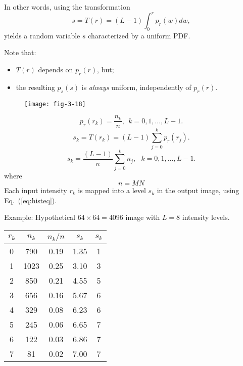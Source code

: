 \begin{frame}
In other words, using the transformation
\[
\boxed{s = T(r) = \left (L - 1\right ) \int_{0}^{r} p_{r}(w) dw},
\]
yields a random variable $s$ characterized by a uniform PDF.

Note that:
\begin{itemize}
\item $T(r)$ depends on $p_{r}(r)$, but;
\item the resulting $p_{s}(s)$ is \textit{always} uniform, independently of $p_{r}(r)$.
\end{itemize}
\begin{figure}
\centering
\texttt{[image: fig-3-18]}
\end{figure}
\end{frame}


\begin{frame}
\[
p_{r}(r_{k}) = \dfrac{n_{k}}{n},\ \ k = 0,1,\ldots,L-1.
\]
\[
s_{k} = T(r_{k}) = (L-1)\sum_{j=0}^{k}p_{r}(r_{j}).
\]
\begin{equation}
\boxed{s_{k} = \dfrac{(L-1)}{n}\sum_{j=0}^{k}n_{j}},\ \ \ k = 0,1,\ldots,L-1.
\label{eq:histeq}
\end{equation}
where
\[
n = MN
\]
Each input intensity $r_{k}$ is mapped into a level $s_{k}$ in the output image, using Eq.~(\ref{eq:histeq}).
\end{frame}


\begin{frame}
Example: Hypothetical $64\times 64 = 4096$ image with $L=8$ intensity levels.
\begin{table}
\centering
\begin{tabular}{ccccc}
\hline
$r_{k}$ & $n_{k}$ & $n_{k}/n$ & $s_{k}$ & $s_{k}$ \\
\hline
0 & 790 & 0.19 & 1.35 & 1 \\
1 & 1023 & 0.25 & 3.10 & 3 \\
2 & 850 & 0.21 & 4.55 & 5 \\
3 & 656 & 0.16 & 5.67 & 6 \\
4 & 329 & 0.08 & 6.23 & 6 \\
5 & 245 & 0.06 & 6.65 & 7 \\
6 & 122 & 0.03 & 6.86 & 7 \\
7 & 81 & 0.02 & 7.00 & 7 \\
\hline
\end{tabular}
\end{table}
\end{frame}

